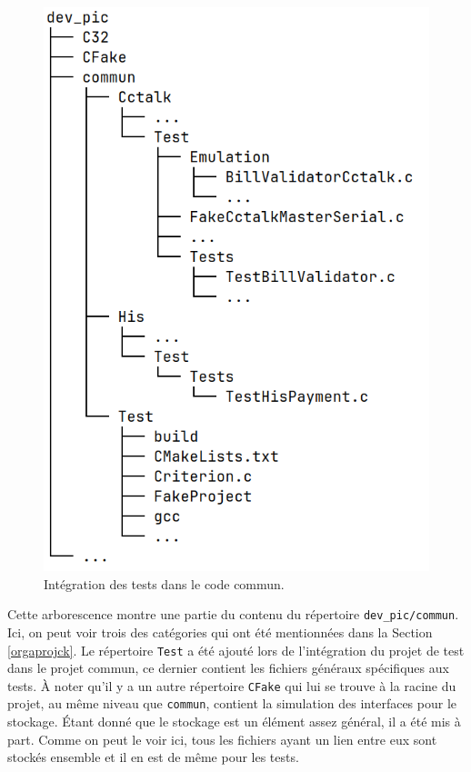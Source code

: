 \documentclass[a4paper]{article}
\begin{document}
\begin{figure}[h!]
  \begin{center}
    \includegraphics[scale=0.4]{./img/arborescence-commun.png}
    \caption{Intégration des tests dans le code commun.}
    \label{fig:integrtestcommun}
  \end{center}
\end{figure}

Cette arborescence montre une partie du contenu du répertoire
\verb|dev_pic/commun|. Ici, on peut voir trois des catégories qui ont été
mentionnées dans la Section \ref{orgaprojck}. Le répertoire \verb|Test| a été
ajouté lors de l'intégration du projet de test dans le projet commun, ce dernier
contient les fichiers généraux spécifiques aux tests. À noter qu'il y a un autre
répertoire \verb|CFake| qui lui se trouve à la racine du projet, au même niveau
que \verb|commun|, contient la simulation des interfaces pour le stockage.
Étant donné que le stockage est un élément assez général, il a été mis à part.
Comme on peut le voir ici, tous les fichiers ayant un lien entre eux sont
stockés ensemble et il en est de même pour les tests.
\end{document}
